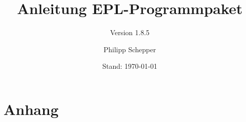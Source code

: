\documentclass[a4paper,ngerman,oneside]{scrbook}
\title{Anleitung EPL-Programmpaket}
\subtitle{Version 1.8.5}
\author{Philipp Schepper}
\date{Stand: \today}
\begin{document}
\maketitle

\frontmatter
\tableofcontents


\mainmatter






\appendix
\part{Anhang}



\end{document}
